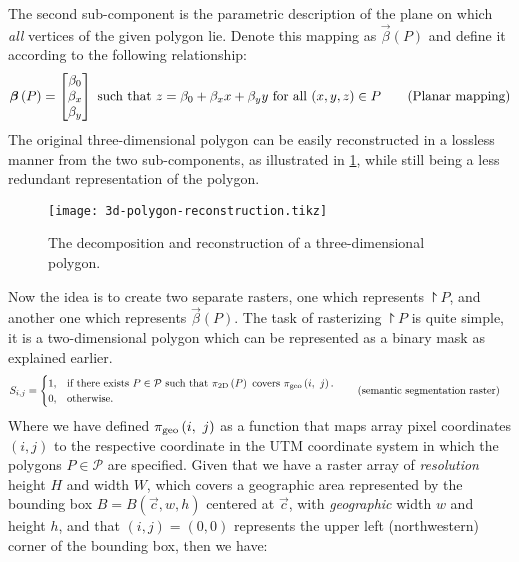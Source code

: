 The second sub-component is the parametric description of the plane on which \emph{all} vertices of the given polygon lie.
Denote this mapping as $\vec{\beta}(P)$ and define it according to the following relationship:
\begin{align}
  \boldsymbol{\beta}\left(P\right)
  =
  \begin{bmatrix}
    \beta_0 \\
    \beta_x \\
    \beta_y \\
  \end{bmatrix}
  \text{ such that }
  z = \beta_0 + \beta_x x + \beta_y y \text{ for all } (x, y, z) \in P
  \tag{Planar mapping}\label{eq:planar}
\end{align}
The original three-dimensional polygon can be easily reconstructed in a lossless manner from the two sub-components, as illustrated in \cref{fig:3d-polygon-reconstruction}, while still being a less redundant representation of the polygon.
%
\begin{figure}[H]
  \centering
  \texttt{[image: 3d-polygon-reconstruction.tikz]}
  \caption{%
    The decomposition and reconstruction of a three-dimensional polygon.
  }%
  \label{fig:3d-polygon-reconstruction}
\end{figure}
\noindent
Now the idea is to create two separate rasters, one which represents $\project{P}$, and another one which represents $\vec{\beta}(P)$.
The task of rasterizing $\project{P}$ is quite simple, it is a two-dimensional polygon which can be represented as a binary mask as explained earlier.
\begin{align*}
  S_{i,j} &= \begin{cases}
    1, &\text{if there exists } P \in \mathcal{P} \text{ such that } \pi_{\mathrm{2D}}\left(P\right) \text{ covers } \pi_{\mathrm{geo}}\left(i,~j\right).\\
    0, &\text{otherwise.}
  \end{cases}
  \tag{semantic segmentation raster}
\end{align*}
Where we have defined $\pi_{\mathrm{geo}}\left(i,~j\right)$ as a function that maps array pixel coordinates $(i, j)$ to the respective coordinate in the UTM coordinate system in which the polygons $P \in \mathcal{P}$ are specified.
Given that we have a raster array of \emph{resolution} height $H$ and width $W$, which covers a geographic area represented by the bounding box $B = B(\vec{c}, w, h)$ centered at $\vec{c}$, with \emph{geographic} width $w$ and height $h$, and that $(i, j) = (0, 0)$ represents the upper left (northwestern) corner of the bounding box, then we have:
